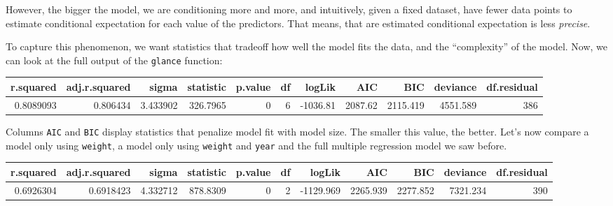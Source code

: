 \documentclass[]{article}
\newenvironment{Shaded}{\begin{snugshade}}{\end{snugshade}}
\newcommand{\KeywordTok}[1]{\textcolor[rgb]{0.13,0.29,0.53}{\textbf{{#1}}}}
\newcommand{\DataTypeTok}[1]{\textcolor[rgb]{0.13,0.29,0.53}{{#1}}}
\newcommand{\StringTok}[1]{\textcolor[rgb]{0.31,0.60,0.02}{{#1}}}
\newcommand{\NormalTok}[1]{{#1}}
\theoremstyle{definition}
\theoremstyle{definition}
\theoremstyle{remark}
\begin{document}
However, the bigger the model, we are conditioning more and more, and
intuitively, given a fixed dataset, have fewer data points to estimate
conditional expectation for each value of the predictors. That means,
that are estimated conditional expectation is less \emph{precise}.

To capture this phenomenon, we want statistics that tradeoff how well
the model fits the data, and the ``complexity'' of the model. Now, we
can look at the full output of the \texttt{glance} function:

\begin{Shaded}
\end{Shaded}

\begin{tabular}{r|r|r|r|r|r|r|r|r|r|r}
\hline
r.squared & adj.r.squared & sigma & statistic & p.value & df & logLik & AIC & BIC & deviance & df.residual\\
\hline
0.8089093 & 0.806434 & 3.433902 & 326.7965 & 0 & 6 & -1036.81 & 2087.62 & 2115.419 & 4551.589 & 386\\
\hline
\end{tabular}

Columns \texttt{AIC} and \texttt{BIC} display statistics that penalize
model fit with model size. The smaller this value, the better. Let's now
compare a model only using \texttt{weight}, a model only using
\texttt{weight} and \texttt{year} and the full multiple regression model
we saw before.

\begin{Shaded}
\end{Shaded}

\begin{tabular}{r|r|r|r|r|r|r|r|r|r|r}
\hline
r.squared & adj.r.squared & sigma & statistic & p.value & df & logLik & AIC & BIC & deviance & df.residual\\
\hline
0.6926304 & 0.6918423 & 4.332712 & 878.8309 & 0 & 2 & -1129.969 & 2265.939 & 2277.852 & 7321.234 & 390\\
\hline
\end{tabular}
\end{document}
